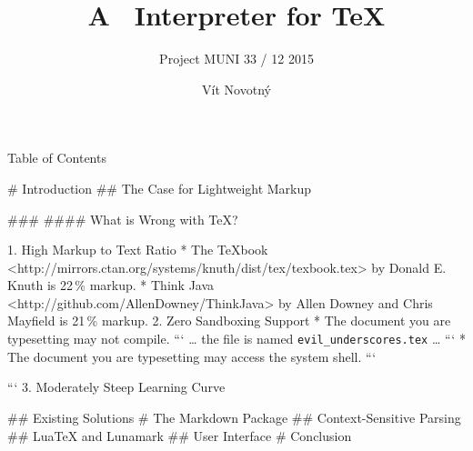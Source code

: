 \documentclass{beamer}
\title{A \raisebox{-1.7mm}{\texttt{[image: markdown-mark]}}\ Interpreter for \TeX}
\subtitle{Project MUNI 33 / 12 2015}
\author{Vít Novotný}
\begin{document}
\frame{\maketitle}


\begin{darkframes}
\begin{frame}{Table of Contents}
  \tableofcontents
\end{frame}
\begin{markdown}
# Introduction
## The Case for Lightweight Markup
\begin{frame}
### \subsecname
#### What is Wrong with \TeX?

  1. High Markup to Text Ratio
    * The \TeX book <http://mirrors.ctan.org/systems/knuth/dist/tex/texbook.tex> by Donald E. Knuth is 22\,\% markup.
    * Think Java <http://github.com/AllenDowney/ThinkJava> by Allen Downey and Chris Mayfield is 21\,\% markup.
  2. Zero Sandboxing Support
    * The document you are typesetting may not compile.
    ```
    … the file is named \texttt{evil_underscores.tex} …
    ```
    * The document you are typesetting may access the system shell.
    ```
    \immediate{} %
    ```
  3. Moderately Steep Learning Curve

\end{frame}
## Existing Solutions
# The Markdown Package
## Context-Sensitive Parsing
## Lua\TeX{} and Lunamark
## User Interface
# Conclusion
\end{markdown}
\end{darkframes}
\end{document}
